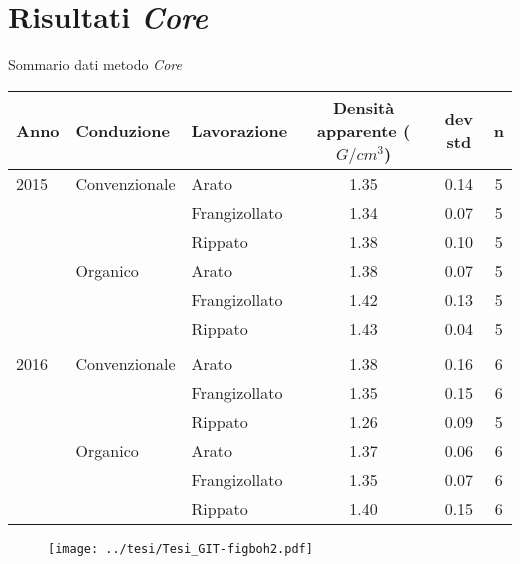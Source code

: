 \section{Risultati \emph{Core}}
\begin{frame}{Sommario dati metodo \emph{Core}}
  \footnotesize
  \begin{table}[ht]
    \centering
    \begin{tabular}{lllccc}
      \hline
      Anno & Conduzione & Lavorazione & Densit\`a apparente
                                        ($G/cm^3$) & dev std & n \\ 
      \hline
      2015 & Convenzionale & Arato & 1.35 & 0.14 &   5 \\ 
           &   & Frangizollato & 1.34 & 0.07 &   5 \\ 
           &   & Rippato & 1.38 & 0.10 &   5 \\ 
           & Organico & Arato & 1.38 & 0.07 &   5 \\ 
           &   & Frangizollato & 1.42 & 0.13 &   5 \\ 
           &   & Rippato & 1.43 & 0.04 &   5 \\ 
      \\
      2016 & Convenzionale & Arato & 1.38 & 0.16 &   6 \\ 
           &   & Frangizollato & 1.35 & 0.15 &   6 \\ 
           &   & Rippato & 1.26 & 0.09 &   5 \\ 
           & Organico & Arato & 1.37 & 0.06 &   6 \\ 
           &   & Frangizollato & 1.35 & 0.07 &   6 \\ 
           &   & Rippato & 1.40 & 0.15 &   6 \\ 
      \hline
    \end{tabular}
    \label{tab:RiassuntoDensitaCAmpo}
  \end{table}
\end{frame}

\begin{frame}
  \begin{figure}[ht]
    \texttt{[image: ../tesi/Tesi\_GIT-figboh2.pdf]}
  \end{figure}
\end{frame}

